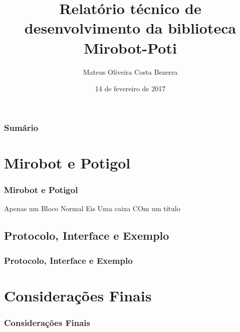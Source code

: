 \documentclass{beamer}
\begin{document}
\title[Relatório Técnico]
      {Relatório técnico de desenvolvimento da biblioteca Mirobot-Poti}
  \author{Mateus Oliveira Costa Bezerra}
  \date{14 de fevereiro de 2017}
\begin{frame}
  \label{capa}
  \maketitle
\end{frame}

\begin{frame}
  \label{sumario}
  \frametitle{Sumário}
  \tableofcontents
\end{frame}

\begin{frame}
  \label{mirobot:potigol}
  \section{Mirobot e Potigol}
  \frametitle{Mirobot e Potigol}
  \begin{block}{Apenas um Bloco Normal}
    Eis Uma caixa COm um título
  \end{block}
\end{frame}

\begin{frame}
  \section{Protocolo, Interface e Exemplo}
  \label{protocolo}
  \frametitle{Protocolo, Interface e Exemplo}
\end{frame}

\begin{frame}
  \label{consideracoes}
  \section{Considerações Finais}
  \frametitle{Considerações Finais}
\end{frame}
\end{document}
